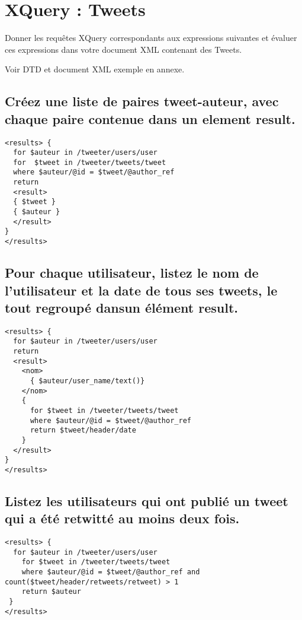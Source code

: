 \chapter{XQuery : Tweets}
Donner les requêtes XQuery correspondants aux expressions suivantes et évaluer ces expressions dans votre document XML contenant des Tweets.

Voir DTD et document XML exemple en annexe.

\section{Créez une liste de paires tweet-auteur, avec chaque paire contenue dans un element result.}
\begin{verbatim}
<results> {
  for $auteur in /tweeter/users/user 
  for  $tweet in /tweeter/tweets/tweet
  where $auteur/@id = $tweet/@author_ref  
  return
  <result>
  { $tweet }
  { $auteur }
  </result>  
}
</results>
\end{verbatim}


\section{Pour chaque utilisateur, listez le nom de l’utilisateur et la date de tous ses tweets, le tout regroupé dansun élément result.}
\begin{verbatim}
<results> {
  for $auteur in /tweeter/users/user
  return
  <result>
    <nom>
      { $auteur/user_name/text()}
    </nom> 
    {
      for $tweet in /tweeter/tweets/tweet
      where $auteur/@id = $tweet/@author_ref  
      return $tweet/header/date
    }
  </result>
}
</results>
\end{verbatim}

\section{Listez les utilisateurs qui ont publié un tweet qui a été retwitté au moins deux fois.}
\begin{verbatim}
<results> {
  for $auteur in /tweeter/users/user
    for $tweet in /tweeter/tweets/tweet
    where $auteur/@id = $tweet/@author_ref and count($tweet/header/retweets/retweet) > 1
    return $auteur
 }
</results>
\end{verbatim}


